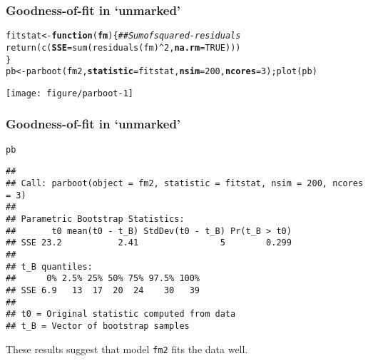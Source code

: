 \documentclass[color=usenames,dvipsnames]{beamer}\usepackage[]{graphicx}\usepackage[]{color}
\makeatletter
\newcommand{\hlnum}[1]{\textcolor[rgb]{0.69,0.494,0}{#1}}%
\newcommand{\hlcom}[1]{\textcolor[rgb]{0.514,0.506,0.514}{\textit{#1}}}%
\newcommand{\hlopt}[1]{\textcolor[rgb]{0,0,0}{#1}}%
\newcommand{\hlstd}[1]{\textcolor[rgb]{0,0,0}{#1}}%
\newcommand{\hlkwa}[1]{\textcolor[rgb]{0,0,0}{\textbf{#1}}}%
\newcommand{\hlkwb}[1]{\textcolor[rgb]{0,0.341,0.682}{#1}}%
\newcommand{\hlkwc}[1]{\textcolor[rgb]{0,0,0}{\textbf{#1}}}%
\newcommand{\hlkwd}[1]{\textcolor[rgb]{0.004,0.004,0.506}{#1}}%
\newenvironment{kframe}{%
 \def\at@end@of@kframe{}%
 \ifinner\ifhmode%
  \def\at@end@of@kframe{\end{minipage}}%
  \begin{minipage}{\columnwidth}%
 \fi\fi%
 \def\FrameCommand##1{\hskip\@totalleftmargin \hskip-\fboxsep
 \colorbox{shadecolor}{##1}\hskip-\fboxsep
     \hskip-\linewidth \hskip-\@totalleftmargin \hskip\columnwidth}%
 \MakeFramed {\advance\hsize-\width
   \@totalleftmargin\z@ \linewidth\hsize
   \@setminipage}}%
 {\par\unskip\endMakeFramed%
 \at@end@of@kframe}
\newenvironment{knitrout}{}{} %
\newcommand{\inr}[1]{\colorbox{inlinecolor}{\texttt{#1}}}
\makeatother
\begin{document}
\begin{frame}[fragile]
  \frametitle{Goodness-of-fit in `unmarked'}
\begin{knitrout}\scriptsize
{}\color{fgcolor}\begin{kframe}
\begin{alltt}
\hlstd{fitstat} \hlkwb{<-} \hlkwa{function}\hlstd{(}\hlkwc{fm}\hlstd{) \{} \hlcom{## Sum of squared-residuals}
    \hlkwd{return}\hlstd{(}\hlkwd{c}\hlstd{(}\hlkwc{SSE}\hlstd{=}\hlkwd{sum}\hlstd{(}\hlkwd{residuals}\hlstd{(fm)}\hlopt{^}\hlnum{2}\hlstd{,} \hlkwc{na.rm}\hlstd{=}\hlnum{TRUE}\hlstd{)))}
\hlstd{\}}
\hlstd{pb} \hlkwb{<-} \hlkwd{parboot}\hlstd{(fm2,} \hlkwc{statistic}\hlstd{=fitstat,} \hlkwc{nsim}\hlstd{=}\hlnum{200}\hlstd{,} \hlkwc{ncores}\hlstd{=}\hlnum{3}\hlstd{);} \hlkwd{plot}\hlstd{(pb)}
\end{alltt}
\end{kframe}

{\centering \texttt{[image: figure/parboot-1]} 

}


\end{knitrout}
\end{frame}



\begin{frame}[fragile]
  \frametitle{Goodness-of-fit in `unmarked'}
\begin{knitrout}\scriptsize
{}\color{fgcolor}\begin{kframe}
\begin{alltt}
\hlstd{pb}
\end{alltt}
\begin{verbatim}
## 
## Call: parboot(object = fm2, statistic = fitstat, nsim = 200, ncores = 3)
## 
## Parametric Bootstrap Statistics:
##       t0 mean(t0 - t_B) StdDev(t0 - t_B) Pr(t_B > t0)
## SSE 23.2           2.41                5        0.299
## 
## t_B quantiles:
##      0% 2.5% 25% 50% 75% 97.5% 100%
## SSE 6.9   13  17  20  24    30   39
## 
## t0 = Original statistic computed from data
## t_B = Vector of bootstrap samples
\end{verbatim}
\end{kframe}
\end{knitrout}
\vfill
These results suggest that model \inr{fm2} fits the data well.
\end{frame}
\end{document}
